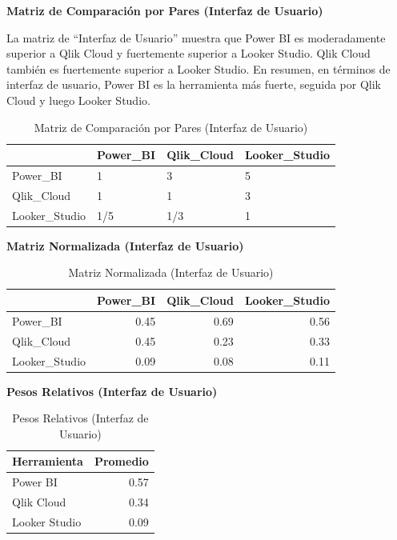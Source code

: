 \documentclass[
  11pt,
  bookmarksnumbered]{article}
\begin{document}
\textbf{Matriz de Comparación por Pares (Interfaz de Usuario)}

La matriz de ``Interfaz de Usuario'' muestra que Power BI es moderadamente superior a Qlik Cloud y fuertemente superior a Looker Studio. Qlik Cloud también es fuertemente superior a Looker Studio. En resumen, en términos de interfaz de usuario, Power BI es la herramienta más fuerte, seguida por Qlik Cloud y luego Looker Studio.

\begin{table}[H]

\caption{\label{tab:unnamed-chunk-42}Matriz de Comparación por Pares (Interfaz de Usuario)}
\centering
\fontsize{12}{14}\selectfont
\begin{tabular}[t]{l|l|l|l}
\hline
  & Power\_BI & Qlik\_Cloud & Looker\_Studio\\
\hline
Power\_BI & 1 & 3 & 5\\
\hline
Qlik\_Cloud & 1 & 1 & 3\\
\hline
Looker\_Studio & 1/5 & 1/3 & 1\\
\hline
\end{tabular}
\end{table}

\textbf{Matriz Normalizada (Interfaz de Usuario)}

\begin{table}[H]

\caption{\label{tab:unnamed-chunk-43}Matriz Normalizada (Interfaz de Usuario)}
\centering
\fontsize{12}{14}\selectfont
\begin{tabular}[t]{l|r|r|r}
\hline
  & Power\_BI & Qlik\_Cloud & Looker\_Studio\\
\hline
Power\_BI & 0.45 & 0.69 & 0.56\\
\hline
Qlik\_Cloud & 0.45 & 0.23 & 0.33\\
\hline
Looker\_Studio & 0.09 & 0.08 & 0.11\\
\hline
\end{tabular}
\end{table}

\textbf{Pesos Relativos (Interfaz de Usuario)}

\begin{table}[H]

\caption{\label{tab:unnamed-chunk-44}Pesos Relativos (Interfaz de Usuario)}
\centering
\fontsize{12}{14}\selectfont
\begin{tabular}[t]{l|r}
\hline
Herramienta & Promedio\\
\hline
Power BI & 0.57\\
\hline
Qlik Cloud & 0.34\\
\hline
Looker Studio & 0.09\\
\hline
\end{tabular}
\end{table}
\end{document}
